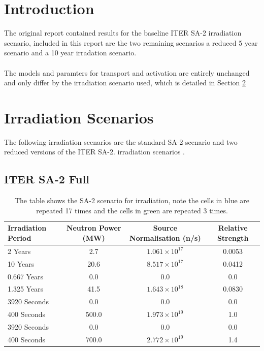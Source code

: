 \documentclass[12pt]{article}
\renewcommand{\listoffigures}{\begingroup
\tocsection
\tocfile{\listfigurename}{lof}
\endgroup}
\renewcommand{\listoftables}{\begingroup
\tocsection
\tocfile{\listtablename}{lot}
\endgroup}
\begin{document}
\maketitle
\newpage
\tableofcontents
\newpage
\listoffigures
\newpage
\listoftables
\newpage
\section{Introduction}
The original report \cite{iter_sdr_report} contained results for the baseline
ITER SA-2 irradiation scenario, included in this report are the two remaining
scenarios a reduced 5 year scenario and a 10 year irradation scenario. 
\\
\\
The models and paramters for transport and activation are entirely unchanged 
and only differ by the irradiation scenario used, which is detailed in Section
\ref{sec:irradiation_scenario}
\newpage
\section{Irradiation Scenarios}
\label{sec:irradiation_scenario}
The following irradiation scenarios are the standard SA-2 scenario and 
two reduced versions of the ITER SA-2.
irradiation scenarios \cite{sa2_irradiation}. 
\subsection{ITER SA-2 Full}
\begin{table}[ht!]
   \begin{tabular}{| l | c | c | c |}
      \hline 
      Irradiation Period & Neutron Power (MW) & Source Normalisation (n/s) &  Relative Strength \\
      \hline
      2 Years & 2.7 & $1.061\times10^{17}$ & 0.0053 \\
      10 Years & 20.6 & $8.517\times10^{17}$ & 0.0412 \\
      0.667 Years & 0.0 & 0.0 & 0.0 \\
      1.325 Years & 41.5 & $1.643\times10^{18}$ & 0.0830 \\
      \cellcolor{blue!25} 3920 Seconds & \cellcolor{blue!25} 0.0 & \cellcolor{blue!25} 0.0 & \cellcolor{blue!25} 0.0 \\
      \cellcolor{blue!25} \cellcolor{blue!25} 400 Seconds & \cellcolor{blue!25} 500.0 & \cellcolor{blue!25} $1.973\times10^{19}$ & \cellcolor{blue!25} 1.0  \\
      \cellcolor{green!25} 3920 Seconds & \cellcolor{green!25} 0.0 & \cellcolor{green!25} 0.0 &\cellcolor{green!25} 0.0 \\
      \cellcolor{green!25} 400 Seconds & \cellcolor{green!25} 700.0 & \cellcolor{green!25} $2.772\times10^{19}$ &\cellcolor{green!25} 1.4 \\
      \hline
\end{tabular}
\caption{The table shows the SA-2 scenario for irradiation, note the
         cells in \textcolor{blue!25}{blue} are repeated 17 times
         and the cells in \textcolor{green!25}{green} are repeated 3
         times.}
\label{tab:irrad_scenario}
\end{table}
\end{document}
